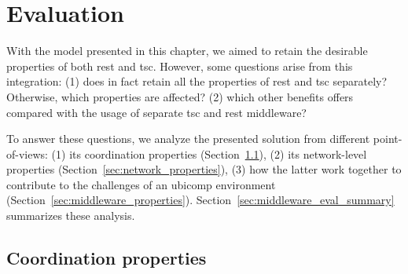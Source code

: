 \section{Evaluation}
\label{sec:middleware_qualitative_evaluation}

With the model presented in this chapter, we aimed to retain the desirable properties of both \ac{rest} and \ac{tsc}. %
However, some questions arise from this integration:
(1) does in fact retain all the properties of \ac{rest} and \ac{tsc} separately? Otherwise, which properties are affected?
(2) which other benefits offers compared with the usage of separate \ac{tsc} and \ac{rest} middleware?



To answer these questions, we analyze the presented solution from different point-of-views:
(1) its coordination properties (Section~\ref{sec:coordination_properties}),
(2) its network-level properties (Section~\ref{sec:network_properties}),
(3) how the latter work together to contribute to the challenges of an \ac{ubicomp} environment (Section~\ref{sec:middleware_properties}).
Section~\ref{sec:middleware_eval_summary} summarizes these analysis. %




\subsection{Coordination properties}
\label{sec:coordination_properties}


